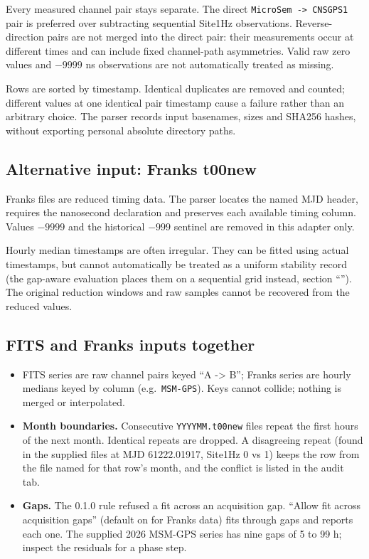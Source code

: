\documentclass[11pt,a4paper]{article}
\renewcommand{\_}{\usscore\allowbreak}
\begin{document}
Every measured channel pair stays separate. The direct
\texttt{MicroSem -> CNS\_GPS1} pair is preferred over subtracting sequential
Site1Hz observations. Reverse-direction pairs are not merged into the direct
pair: their measurements occur at different times and can include fixed
channel-path asymmetries. Valid raw zero values and \(-9999\) ns observations
are not automatically treated as missing.

Rows are sorted by timestamp. Identical duplicates are removed and counted;
different values at one identical pair timestamp cause a failure rather than
an arbitrary choice. The parser records input basenames, sizes and SHA256
hashes, without exporting personal absolute directory paths.

\subsection{Alternative input: Franks t00new}
Franks files are reduced timing data. The parser locates the named MJD header,
requires the nanosecond declaration and preserves each available timing column.
Values \(-9999\) and the historical \(-999\) sentinel are removed in this adapter
only.

Hourly median timestamps are often irregular. They can be fitted using actual
timestamps, but cannot automatically be treated as a uniform stability record (the
gap-aware evaluation places them on a sequential grid instead, section
``''). The original reduction windows and raw samples cannot be
recovered from the reduced values.

\subsection{FITS and Franks inputs together}
\begin{itemize}
\item FITS series are raw channel pairs keyed ``A -> B''; Franks series are hourly medians keyed
by column (e.g.\ \texttt{MSM-GPS}). Keys cannot collide; nothing is merged or interpolated.
\item \textbf{Month boundaries.} Consecutive \texttt{YYYY\_MM.t00new} files repeat the first hours
of the next month. Identical repeats are dropped. A disagreeing repeat (found in the supplied
files at MJD 61222.01917, Site1Hz 0 vs 1) keeps the row from the file named for that row's month,
and the conflict is listed in the audit tab.
\item \textbf{Gaps.} The 0.1.0 rule refused a fit across an acquisition gap. ``Allow fit across
acquisition gaps'' (default on for Franks data) fits through gaps and reports each one. The
supplied 2026 MSM-GPS series has nine gaps of 5 to 99 h; inspect the residuals for a phase step.
\end{itemize}
\end{document}
